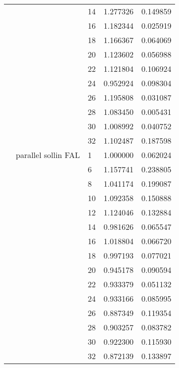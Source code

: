 \begin{tabular}{lllrr}
                      &                     & 14 &  1.277326 &  0.149859 \\
                      &                     & 16 &  1.182344 &  0.025919 \\
                      &                     & 18 &  1.166367 &  0.064069 \\
                      &                     & 20 &  1.123602 &  0.056988 \\
                      &                     & 22 &  1.121804 &  0.106924 \\
                      &                     & 24 &  0.952924 &  0.098304 \\
                      &                     & 26 &  1.195808 &  0.031087 \\
                      &                     & 28 &  1.083450 &  0.005431 \\
                      &                     & 30 &  1.008992 &  0.040752 \\
                      &                     & 32 &  1.102487 &  0.187598 \\
                      & parallel sollin FAL & 1  &  1.000000 &  0.062024 \\
                      &                     & 6  &  1.157741 &  0.238805 \\
                      &                     & 8  &  1.041174 &  0.199087 \\
                      &                     & 10 &  1.092358 &  0.150888 \\
                      &                     & 12 &  1.124046 &  0.132884 \\
                      &                     & 14 &  0.981626 &  0.065547 \\
                      &                     & 16 &  1.018804 &  0.066720 \\
                      &                     & 18 &  0.997193 &  0.077021 \\
                      &                     & 20 &  0.945178 &  0.090594 \\
                      &                     & 22 &  0.933379 &  0.051132 \\
                      &                     & 24 &  0.933166 &  0.085995 \\
                      &                     & 26 &  0.887349 &  0.119354 \\
                      &                     & 28 &  0.903257 &  0.083782 \\
                      &                     & 30 &  0.922300 &  0.115930 \\
                      &                     & 32 &  0.872139 &  0.133897 \\
\bottomrule
\end{tabular}
